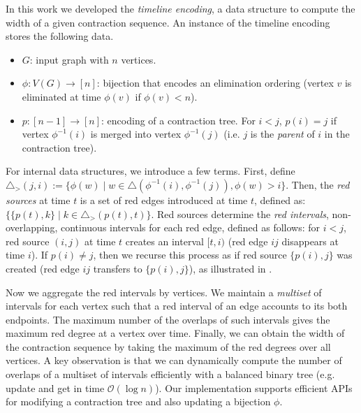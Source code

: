 \documentclass[a4paper,UKenglish,cleveref, autoref, thm-restate]{lipics-v2021}
\begin{document}
In this work we developed the \emph{timeline encoding}, a data structure to 
compute the width of a given contraction sequence.
An instance of the timeline encoding stores the following data.

\begin{itemize}
    \item $G$: input graph with $n$ vertices.
    \item $\phi: V(G) \to [n]$: bijection that encodes an elimination ordering
    (vertex $v$ is eliminated at time $\phi(v)$ if $\phi(v)<n$).
    \item $p: [n - 1] \to [n]$: encoding of a contraction tree.
    For $i<j$, $p(i)=j$ if vertex $\phi^{-1}(i)$ is merged into vertex $\phi^{-1}(j)$
    (i.e. $j$ is the \emph{parent} of $i$ in the contraction tree).
\end{itemize}

For internal data structures, we introduce a few terms.
%
First, define $\triangle_{>}(j,i)
:= \{\phi(w) \mid w \in \triangle(\phi^{-1}(i), \phi^{-1}(j)), \phi(w) > i\}$.
%
Then, the \emph{red sources} at time $t$ is a set of red edges
introduced at time $t$, defined as:
$\{\{p(t), k\} \mid k \in \triangle_{>}(p(t), t)\}$.
%
Red sources determine the \emph{red intervals},
non-overlapping, continuous intervals for each red edge, defined as follows:
%
for $i<j$, red source $(i, j)$ at time $t$ creates an interval $[t,i)$
(red edge $ij$ disappears at time $i$).
If $p(i) \neq j$, then we recurse this process as if red source $\{p(i), j\}$ was created
(red edge $ij$ transfers to $\{p(i),j\}$),
as illustrated in .

Now we aggregate the red intervals by vertices.
%
We maintain a \emph{multiset} of intervals for each vertex
such that a red interval of an edge accounts to its both endpoints.
%
The maximum number of the overlaps of such intervals gives
the maximum red degree at a vertex over time.
%
Finally, we can obtain the width of the contraction sequence by
taking the maximum of the red degrees over all vertices.
%
A key observation is that we can dynamically compute the number of overlaps of a multiset of
intervals efficiently with a balanced binary tree (e.g. update and get in time $\mathcal{O}(\log n)$).
%
Our implementation supports efficient APIs for modifying a contraction tree
and also updating a bijection $\phi$.
\end{document}
